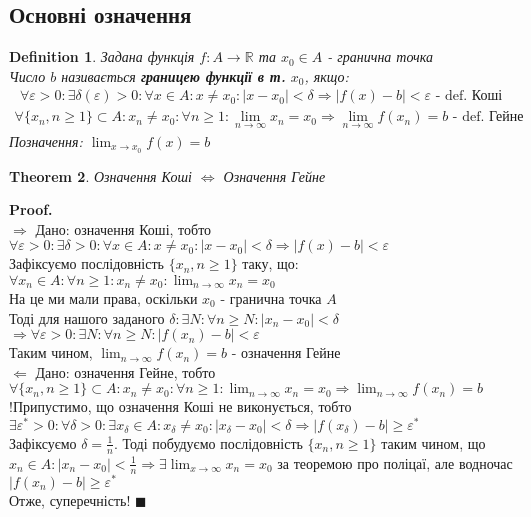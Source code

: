 \documentclass[a4paper, 14pt]{extarticle}
\def\huge{\displaystyle}
\def\bigline{\vspace{5mm}\\}
\def\rightproof{$\boxed{\Rightarrow}$ }
\def\leftproof{$\boxed{\Leftarrow}$ }
\theoremstyle{theoremdd}
\newtheorem{theorem}{Theorem}[subsection]
\theoremstyle{theoremdd}
\newtheorem{definition}[theorem]{Definition}
\theoremstyle{theoremdd}
\theoremstyle{theoremdd}
\theoremstyle{theoremdd}
\theoremstyle{theoremdd}
\theoremstyle{theoremdd}
\theoremstyle{theoremdd}
\newenvironment{pf}{\vspace*{-3mm} \textbf{Proof. \\}}{$\blacksquare$}
\begin{document}
	\subsection{Основні означення}
	\begin{definition}
	Задана функція $f: A \to \mathbb{R}$ та $x_0 \in A$ - гранична точка\\
	Число $b$ називається \textbf{границею функції в т.} $x_0$, якщо:
	\begin{align*}
	\forall \varepsilon > 0: \exists \delta(\varepsilon) > 0: \forall x \in A: x \neq x_0: |x-x_0|<\delta \Rightarrow |f(x)-b|<\varepsilon \textrm{ - def. Коші}
	\end{align*}
	\begin{align*}
	\forall \{x_n, n \geq 1\}\subset A: x_n \neq x_0: \forall n \geq 1: \lim_{n \to \infty} x_n = x_0 \Rightarrow \lim_{n \to \infty} f(x_n) = b \textrm{ - def. Гейне}
	\end{align*}
	Позначення: $\huge \lim_{x \to x_0} f(x) = b$
	\end{definition}
	
	\begin{theorem}
	Означення Коші $\iff$ Означення Гейне
	\end{theorem}
	\begin{pf}
	\rightproof Дано: означення Коші, тобто\\
	$\forall \varepsilon > 0: \exists \delta > 0: \forall x \in A: x \neq x_0: |x-x_0|<\delta \Rightarrow |f(x)-b|<\varepsilon$\\
	Зафіксуємо послідовність $\{x_n, n \geq 1\}$ таку, що:\\
	$\forall x_n \in A: \forall n \geq 1: x_n \neq x_0: \huge \lim_{n \to \infty} x_n = x_0$\\
	На це ми мали права, оскільки $x_0$ - гранична точка $A$\\
	Тоді для нашого заданого $\delta: \exists N: \forall n \geq N: |x_n - x_0| < \delta$\\
	$\Rightarrow \forall \varepsilon > 0: \exists N: \forall n \geq N: |f(x_n) - b| < \varepsilon$\\
	Таким чином, $\huge \lim_{n \to \infty} f(x_n) = b$ - означення Гейне
	\bigline
	\leftproof Дано: означення Гейне, тобто\\
	$\huge \forall \{x_n, n \geq 1\}\subset A: x_n \neq x_0: \forall n \geq 1: \lim_{n \to \infty} x_n = x_0 \Rightarrow \lim_{n \to \infty} f(x_n) = b$\\
	!Припустимо, що означення Коші не виконується, тобто\\
	$\exists \varepsilon^*>0: \forall \delta > 0: \exists x_{\delta} \in A: x_{\delta} \neq x_{0}: |x_{\delta} - x_0| < \delta \Rightarrow |f(x_{\delta}) - b| \geq \varepsilon^*$\\
	Зафіксуємо $\delta = \huge \frac{1}{n}$. Тоді побудуємо послідовність $\{x_n, n \geq 1\}$ таким чином, що $x_n \in A: |x_n-x_0| < \huge \frac{1}{n} \Rightarrow \exists \lim_{x \to \infty} x_n = x_0$ за теоремою про поліцаї, але водночас $|f(x_n) - b| \geq \varepsilon^*$\\
	Отже, суперечність!
	\end{pf}
	
\end{document}
